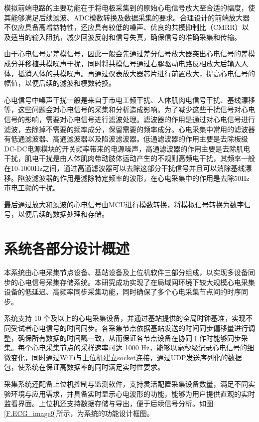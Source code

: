 模拟前端电路的主要功能在于将电极采集到的原始心电信号放大至合适的幅度，使其能够满足后续滤波、ADC模数转换及数据采集的要求。合理设计的前端放大器不仅应具备高增益特性，还应具有较低的噪声、优良的共模抑制比（CMRR）以及适当的输入阻抗，减少回波反射和信号失真，确保信号的准确采集和传输。

由于心电信号是差模信号，因此一般会先通过差分信号放大器突出心电信号的差模成分并移植共模噪声干扰，同时将共模信号通过右腿驱动电路反相放大后输入人体，抵消人体的共模噪声。再通过仪表放大器芯片进行前置放大，提高心电信号的幅值，以便后续的滤波和模数转换。

心电信号中噪声干扰一般是来自于市电工频干扰、人体肌肉电信号干扰、基线漂移等，这些问题会对心电信号的采集和分析造成影响。为了减少这些干扰信号对心电信号的影响，需要对心电信号进行滤波处理。滤波器的作用是通过对心电信号进行滤波，去除掉不需要的频率成分，保留需要的频率成分。心电采集中常用的滤波器有低通滤波器、高通滤波器以及陷波滤波器。低通滤波器的作用主要是去除板级DC-DC电源模块的开关频率带来的电源噪声，高通滤波器的作用主要是去除肌电干扰，肌电干扰是由人体肌肉带动肢体运动产生的不规则高频电干扰，其频率一般在10-1000Hz之间，通过高通滤波器可以去除这部分干扰信号并且可以消除基线漂移。陷波滤波器的作用是滤除特定频率的波形，在心电采集中的作用是去除50Hz市电工频的干扰。

最后通过放大和滤波的心电信号由MCU进行模数转换，将模拟信号转换为数字信号，以便后续的数据处理和存储。

\newpage    %


\section{系统各部分设计概述}

本系统由心电采集节点设备、基站设备及上位机软件三部分组成，以实现多设备同步的心电信号采集存储系统。本研究成功实现了在局域网环境下较大规模心电采集设备的低延迟、高频率同步采集功能，同时确保了多个心电采集节点间的时序同步。

系统支持 10 个及以上的心电采集设备，并通过基站提供的全局时钟基准，实现不同受试者心电信号的时间同步。各采集节点依据基站发送的时间同步偏移量进行调整，确保所有数据的时间戳一致，从而保证各节点设备在协同工作时能够同步采集。每个心电采集节点的采样速率可达 1000 Hz，能够以毫秒级记录心电信号的细微变化，同时通过WiFi与上位机建立socket连接，通过UDP发送序列化的数据包，使系统在保证高数据率的同时满足实时性要求。

采集系统还配备上位机控制与监测软件，支持灵活配置采集设备数量，满足不同实验环境与应用需求，并具备实时显示心电波形的功能，能够为用户提供直观的实时监看界面。上位机还支持数据存储与导出，便于后续信号分析。如图\ref{F.ECG_image9}所示，为系统的功能设计框图。

